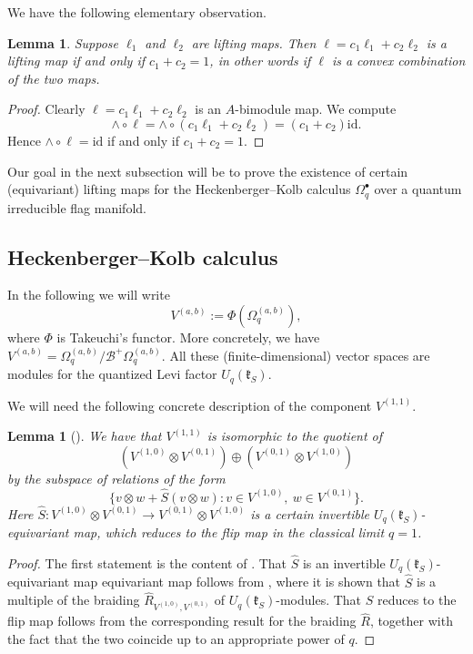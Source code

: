 \documentclass[a4paper,12pt,reqno,english]{amsart}
\numberwithin{equation}{section}
\numberwithin{figure}{section}
\theoremstyle{plain}
\theoremstyle{plain}
\theoremstyle{plain}
\theoremstyle{plain}
\newtheorem{lemma}[theorem]{Lemma}
\theoremstyle{plain}
\theoremstyle{definition}
\theoremstyle{definition}
\theoremstyle{definition}
\theoremstyle{remark}
\theoremstyle{definition}
\newcommand{\UqkS}{U_q(\mathfrak{k}_S)}
\newcommand{\qalg}{\mathcal{B}}
\newcommand{\id}{\mathrm{id}}
\newcommand{\liftmap}{\ell}
\newcommand{\diffcalc}{\Omega_q}
\newcommand{\braidS}{\hat{S}}
\newcommand{\wedgemap}{\mathord{\wedge}}
\begin{document}
We have the following elementary observation.

\begin{lemma}
\label{lem:convex-lifting}
Suppose $\liftmap_1$ and $\liftmap_2$ are lifting maps.
Then $\liftmap = c_1 \liftmap_1 + c_2 \liftmap_2$ is a lifting map if and only if $c_1 + c_2 = 1$, in other words if $\liftmap$ is a convex combination of the two maps.
\end{lemma}

\begin{proof}
Clearly $\liftmap = c_1 \liftmap_1 + c_2 \liftmap_2$ is an $A$-bimodule map. We compute
\[
\wedgemap \circ \liftmap = \wedgemap \circ (c_1 \liftmap_1 + c_2 \liftmap_2) = (c_1 + c_2) \id.
\]
Hence $\wedgemap \circ \liftmap = \id$ if and only if $c_1 + c_2 = 1$.
\end{proof}

Our goal in the next subsection will be to prove the existence of certain (equivariant) lifting maps for the Heckenberger--Kolb calculus $\diffcalc^\bullet$ over a quantum irreducible flag manifold.

\subsection{Heckenberger--Kolb calculus}

In the following we will write
\[
V^{(a, b)} := \Phi(\diffcalc^{(a, b)}),
\]
where $\Phi$ is Takeuchi's functor. More concretely, we have $V^{(a, b)} = \diffcalc^{(a, b)} / \qalg^+ \diffcalc^{(a, b)}$.
All these (finite-dimensional) vector spaces are modules for the quantized Levi factor $\UqkS$.

We will need the following concrete description of the component $V^{(1, 1)}$.

\begin{lemma}[\cite{heko}]
\label{lem:characterization-mixed}
We have that $V^{(1, 1)}$ is isomorphic to the quotient of
\[
(V^{(1, 0)} \otimes V^{(0, 1)}) \oplus (V^{(0, 1)} \otimes V^{(1, 0)})
\]
by the subspace of relations of the form
\[
\{ v \otimes w + \braidS(v \otimes w) : v \in V^{(1, 0)}, \ w \in V^{(0, 1)} \}.
\]
Here $\braidS: V^{(1, 0)} \otimes V^{(0, 1)} \to V^{(0, 1)} \otimes V^{(1, 0)}$ is a certain invertible $\UqkS$-equivariant map, which reduces to the flip map in the classical limit $q = 1$.
\end{lemma}

\begin{proof}
The first statement is the content of \cite[Proposition 3.11(ii)]{heko}.
That $\braidS$ is an invertible $\UqkS$-equivariant map equivariant map follows from \cite[Lemma 2.2]{heko}, where it is shown that $\braidS$ is a multiple of the braiding $\hat{R}_{V^{(1, 0)}, V^{(0, 1)}}$ of $\UqkS$-modules.
That $\braidS$ reduces to the flip map follows from the corresponding result for the braiding $\hat{R}$, together with the fact that the two coincide up to an appropriate power of $q$.
\end{proof}
\end{document}

